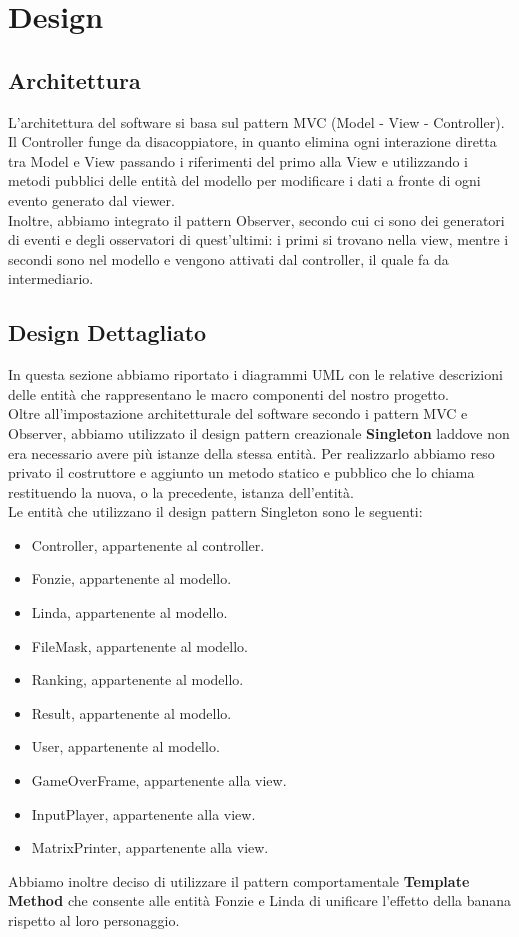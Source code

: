 \documentclass[12pt, letterpaper]{article}
\begin{document}
\section{Design}
    \subsection{Architettura}
        L'architettura del software si basa sul pattern MVC (Model - View - Controller).
        Il Controller funge da disacoppiatore, in quanto elimina ogni interazione diretta tra Model e View passando i riferimenti del primo alla View e utilizzando i metodi pubblici delle entità del modello per modificare i dati a fronte di ogni evento generato dal viewer.\\
        Inoltre, abbiamo integrato il  pattern Observer, secondo cui ci sono dei generatori di eventi e degli osservatori di quest'ultimi: i primi si trovano nella view, mentre i secondi sono nel modello e vengono attivati dal controller, il quale fa da intermediario.
    \newpage
    \subsection{Design Dettagliato}
        In questa sezione abbiamo riportato i diagrammi UML con le relative descrizioni delle entità che rappresentano le macro componenti del nostro progetto. \\
        Oltre all'impostazione architetturale del software secondo i pattern MVC e Observer, abbiamo utilizzato il design pattern creazionale \textbf{Singleton} laddove non era necessario avere più istanze della stessa entità. Per realizzarlo abbiamo reso privato il costruttore e aggiunto un metodo statico e pubblico che lo chiama restituendo la nuova, o la precedente, istanza dell'entità.\\ 
        Le entità che utilizzano il design pattern Singleton sono le seguenti:
        \begin{itemize}
            \item Controller, appartenente al controller.
            \item Fonzie, appartenente al modello.
            \item Linda, appartenente al modello.
            \item FileMask, appartenente al modello.
            \item Ranking, appartenente al modello.
            \item Result, appartenente al modello.
            \item User, appartenente al modello.
            \item GameOverFrame, appartenente alla view.
            \item InputPlayer, appartenente alla view.
            \item MatrixPrinter, appartenente alla view.
        \end{itemize}
        Abbiamo inoltre deciso di utilizzare il pattern comportamentale \textbf{Template Method} che consente alle entità Fonzie e Linda di unificare l'effetto della banana rispetto al loro personaggio.
    \newpage
\end{document}
